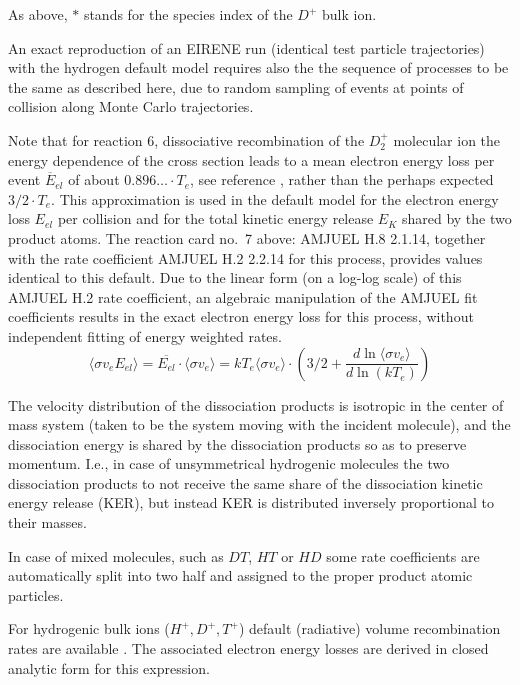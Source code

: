 As above, $\ast$ stands for the species index of the $D^+$ bulk ion.

An exact reproduction of an EIRENE run (identical test particle trajectories)
with the hydrogen default model requires also the the sequence of processes to
be the same as described here, due to random sampling of events at points of
collision along Monte Carlo trajectories.

Note that for reaction 6, dissociative recombination of the $D_2^+$ molecular
ion the energy dependence of the cross section leads to a mean electron energy
loss per event $\overline E_{el}$ of about $0.896\dots \cdot T_e$, see
reference \cite{kn:Reiter93}, rather than the perhaps expected $3/2 \cdot T_e$.
This approximation is used in the default model for the electron energy loss
$E_{el}$ per collision and for the total kinetic energy  release $E_K$ shared
by the two product atoms.
The reaction card no.\ 7 above: AMJUEL H.8 2.1.14, together with the rate
coefficient AMJUEL H.2 2.2.14 for this process, provides values identical to
this default.
Due to the linear form (on a log-log scale) of this AMJUEL H.2 rate
coefficient, an algebraic manipulation of the AMJUEL fit coefficients results
in the exact electron energy loss for this process, without independent fitting
of energy weighted rates.
\begin{equation}
  \label{elloss}
  \langle\sigma v_e E_{el}\rangle = \overline{E_{el}} \cdot \langle\sigma
  v_e\rangle = kT_e \langle\sigma v_e\rangle \cdot
  \left(3/2 + \frac{d \ln \langle\sigma v_e\rangle}{d \ln(kT_e)}\right)
\end{equation}

The velocity distribution of the dissociation products is isotropic in the
center of mass system (taken to be the system moving with the incident
molecule), and the dissociation energy is shared by the dissociation products
so as to preserve momentum.
I.e., in case of unsymmetrical hydrogenic molecules the two dissociation
products to not receive the same share of the dissociation kinetic energy
release (KER), but instead KER is distributed inversely proportional to their
masses.

In case of mixed molecules, such as $DT$, $HT$ or $HD$	some rate coefficients
are automatically split into two half and assigned to the proper product atomic
particles.

For hydrogenic bulk ions ($H^+, D^+, T^+$) default (radiative) volume
recombination rates are available \cite{kn:Gordeev}.
The associated electron energy losses are derived in closed analytic form for
this expression.


